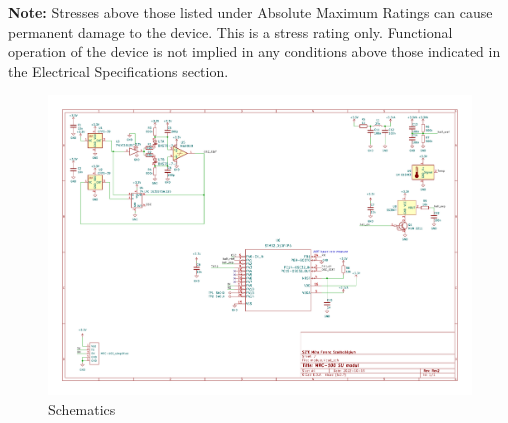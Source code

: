 \documentclass[10pt]{datasheet}
\begin{document}
\textbf{Note:} Stresses above those listed under Absolute Maximum Ratings can
cause permanent damage to the device. This is a stress rating only. Functional
operation of the device is not implied in any conditions above those indicated
in the Electrical Specifications section.

\begin{figure}
	\centering
	\includegraphics[width=1.2\textwidth,angle = 90]{sch}
	\caption{Schematics}
\end{figure}
\end{document}
